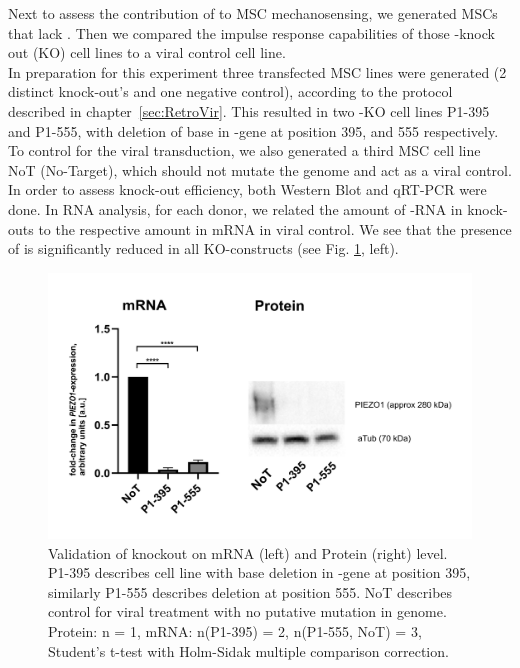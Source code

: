 Next to assess the contribution of \Piezo{} to MSC mechanosensing, we generated MSCs that lack \Piezo{}. Then we compared the impulse response capabilities of those \Piezo{}-knock out (KO) cell lines to a viral control cell line.\\
In preparation for this experiment three transfected MSC lines were generated (2 distinct \Piezo{} knock-out's and one negative control), according to the protocol described in chapter~\vref{sec:RetroVir}. This resulted in two \Piezo{}-KO cell lines P1-395 and P1-555, with deletion of base in \PiezoGene{}-gene at position 395, and 555 respectively. To control for the viral transduction, we also generated a third MSC cell line NoT (No-Target), which should not mutate the genome and act as a viral control.\\ 
In order to assess knock-out efficiency, both Western Blot and qRT-PCR were done.
In RNA analysis, for each donor, we related the amount of \PiezoGene{}-RNA in knock-outs to the respective amount in mRNA in viral control. We see that the presence of \PiezoGene{} is significantly reduced in all KO-constructs (see Fig. \ref{fig:KO-Verification}, left). 

\begin{figure}
	\centering
	\includegraphics[width=\linewidth]{Piezo1KO_Verification_WBandPCR.png}
	\caption{Validation of knockout on mRNA (left) and Protein (right) level. P1-395 describes cell line with base deletion in \PiezoGene{}-gene at position 395, similarly P1-555 describes deletion at position 555. NoT describes control for viral treatment with no putative mutation in genome. Protein: n = 1, mRNA:  n(P1-395) = 2, n(P1-555, NoT) = 3, Student's t-test with Holm-Sidak multiple comparison correction.}
	\label{fig:KO-Verification}
\end{figure}

